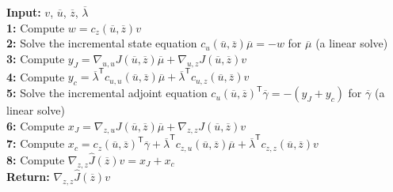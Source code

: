 \documentclass{article}
\newcommand{\trp}{^{\mathsf{T}}}
\begin{document}
\begin{algorithm}
\caption{Adjoint-based hessian vector product calculation}
\label{alg:adjoint_hessvec}
    \textbf{Input: } $v$, $\overline{u}$, $\overline{z}$, $\overline{\lambda}$
    \\
    \textbf{1: } Compute $w = c_z(\overline{u},\overline{z}) v$
    \\
    \textbf{2: } Solve the incremental state equation $c_u(\overline{u},\overline{z}) \overline{\mu} = - w$ for $\overline{\mu}$ (a linear solve)
    \\
    \textbf{3: } Compute $y_J = \nabla_{u,u} J(\overline{u},\overline{z}) \overline{\mu} + \nabla_{u,z} J(\overline{u},\overline{z}) v$
    \\
    \textbf{4: } Compute $y_c = \overline{\lambda}\trp c_{u,u}(\overline{u},\overline{z}) \overline{\mu} +  \overline{\lambda}\trp c_{u,z}(\overline{u},\overline{z}) v$
    \\
    \textbf{5: } Solve the incremental adjoint equation $c_u(\overline{u},\overline{z})\trp \overline{\gamma} = -(y_J + y_c)$ for $\overline{\gamma}$ (a linear solve)
    \\
    \textbf{6: } Compute $x_J= \nabla_{z,u}J(\overline{u},\overline{z}) \overline{\mu} +  \nabla_{z,z}J(\overline{u},\overline{z}) v$
    \\
    \textbf{7: } Compute $x_c = c_z(\overline{u},\overline{z})\trp \overline{\gamma} + \overline{\lambda}\trp c_{z,u}(\overline{u},\overline{z}) \overline{\mu} + \overline{\lambda}\trp c_{z,z}(\overline{u},\overline{z})v $
    \\
    \textbf{8: } Compute $\nabla_{z,z} \hat{J}(\overline{z}) v = x_J + x_c$
    \\
    \textbf{Return: } $\nabla_{z,z} \hat{J}(\overline{z}) v$
\end{algorithm}
\end{document}
